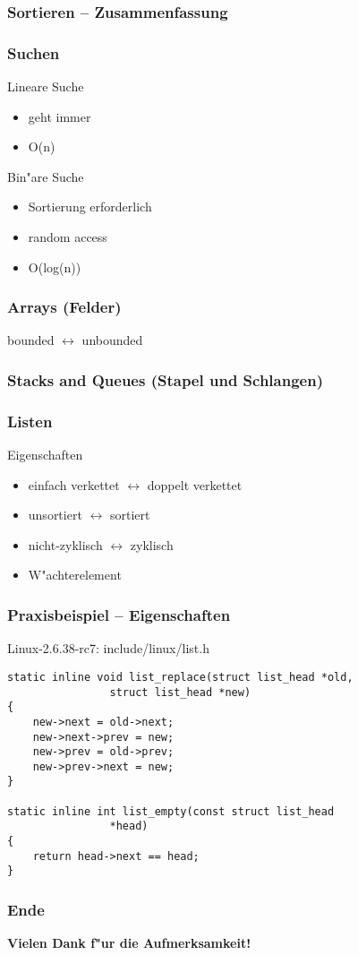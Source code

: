 \documentclass{beamer}
\begin{document}
\begin{frame}
\frametitle{Sortieren -- Zusammenfassung}
\end{frame}


\begin{frame}
\frametitle{Suchen}
\begin{block}{Lineare Suche}
\begin{itemize}
\item geht immer
\item O(n)
\end{itemize}
\end{block}

\pause

\begin{block}{Bin"are Suche}
\begin{itemize}
\item Sortierung erforderlich
\item random access
\item O(log(n))
\end{itemize}
\end{block}
\end{frame}


\begin{frame}
\frametitle{Arrays \tiny(Felder)}
bounded $\leftrightarrow$ unbounded
\end{frame}


\begin{frame}
\frametitle{Stacks and Queues \tiny(Stapel und Schlangen)}
\end{frame}


\begin{frame}
\frametitle{Listen}
\begin{block}{Eigenschaften}
\begin{itemize}
\item einfach verkettet $\leftrightarrow$ doppelt verkettet
\item unsortiert $\leftrightarrow$ sortiert
\item nicht-zyklisch $\leftrightarrow$ zyklisch
\item W"achterelement
\end{itemize}
\end{block}
\end{frame}


\begin{frame}[containsverbatim]
\frametitle{Praxisbeispiel -- Eigenschaften}
\begin{block}{Linux-2.6.38-rc7: include/linux/list.h}
\begin{lstlisting}
static inline void list_replace(struct list_head *old,
				struct list_head *new)
{
	new->next = old->next;
	new->next->prev = new;
	new->prev = old->prev;
	new->prev->next = new;
}

static inline int list_empty(const struct list_head 
				*head)
{
	return head->next == head;
}
\end{lstlisting}
\end{block}
\end{frame}


\begin{frame}
\frametitle{Ende}
\begin{center}
\textbf{\Huge Vielen Dank f"ur die Aufmerksamkeit!}
\end{center}
\end{frame}
\end{document}
